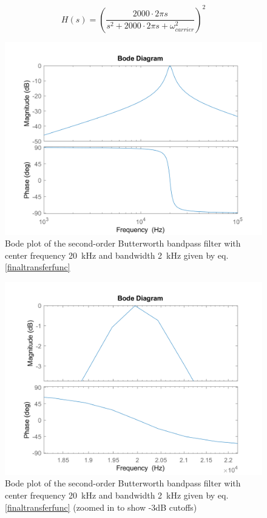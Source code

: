 \documentclass[journal]{IEEEtran}
\begin{document}
\begin{equation}
H\left(s\right)=\left(\frac{2000\cdot2\pi s}{s^2+2000\cdot2\pi s+\omega_{carrier}^2}\right)^2
\label{finaltransferfunc}
\end{equation}

\begin{figure}[ht]
	\centering
 \includegraphics[width=\columnwidth]{bpfBode.png}
    \caption{Bode plot of the second-order Butterworth bandpass filter with center frequency \SI{20}{\kilo\hertz} and bandwidth \SI{2}{\kilo\hertz} given by eq. \eqref{finaltransferfunc}}
    \label{bpfBode}
\end{figure}

\begin{figure}[ht]
	\centering
  \includegraphics[width=\columnwidth]{bpfBodeZoomed.png}
    \caption{Bode plot of the second-order Butterworth bandpass filter with center frequency \SI{20}{\kilo\hertz} and bandwidth \SI{2}{\kilo\hertz} given by eq. \eqref{finaltransferfunc} (zoomed in to show -3dB cutoffs)}   
    \label{bpfBodeZoomed}
\end{figure}
\end{document}

